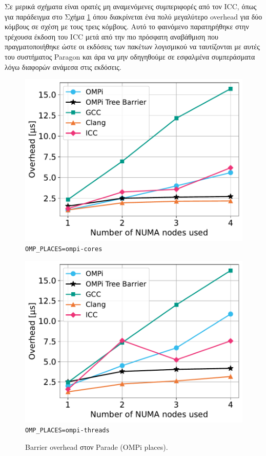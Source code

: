 Σε μερικά σχήματα είναι ορατές μη αναμενόμενες συμπεριφορές από τον ICC, όπως για παράδειγμα στο Σχήμα \ref{fig:bo-parade-ompi-places} όπου διακρίνεται ένα πολύ μεγαλύτερο overhead για δύο κόμβους σε σχέση με τους τρεις κόμβους. Αυτό το φαινόμενο παρατηρήθηκε στην τρέχουσα έκδοση του ICC μετά από την πιο πρόσφατη αναβάθμιση που πραγματοποιήθηκε ώστε οι εκδόσεις των πακέτων λογισμικού να ταυτίζονται με αυτές του συστήματος Paragon και άρα να μην οδηγηθούμε σε εσφαλμένα συμπεράσματα λόγω διαφορών ανάμεσα στις εκδόσεις.

\begin{figure}
    \centering
    \begin{minipage}{0.5\textwidth}
        \centering
        \includegraphics[width=1\textwidth]{Figures/epcc_20210823_175412/ompi-places_cores_close.pdf}
		\texttt{OMP\_PLACES=ompi-cores}
    \end{minipage}\hfill
    \begin{minipage}{0.5\textwidth}
        \centering
        \includegraphics[width=1\textwidth]{Figures/epcc_20210823_175412/ompi-places_threads_close.pdf}
        \texttt{OMP\_PLACES=ompi-threads}
    \end{minipage}
    \caption{Barrier overhead στον Parade (OMPi places).}
    \label{fig:bo-parade-ompi-places}
\end{figure}

